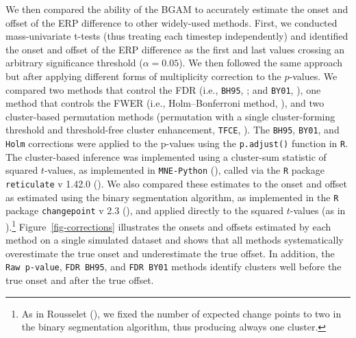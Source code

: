 \documentclass[
  doc,
  floatsintext,
  longtable,
  a4paper,
  nolmodern,
  notxfonts,
  notimes,
  colorlinks=true,linkcolor=blue,citecolor=blue,urlcolor=blue]{apa7}
\begin{document}
We then compared the ability of the BGAM to accurately estimate the
onset and offset of the ERP difference to other widely-used methods.
First, we conducted mass-univariate t-tests (thus treating each timestep
independently) and identified the onset and offset of the ERP difference
as the first and last values crossing an arbitrary significance
threshold (\(\alpha = 0.05\)). We then followed the same approach but
after applying different forms of multiplicity correction to the
\(p\)-values. We compared two methods that control the FDR (i.e.,
\texttt{BH95}, ; and \texttt{BY01}, ), one method that controls the FWER (i.e.,
Holm--Bonferroni method, ), and two
cluster-based permutation methods (permutation with a single
cluster-forming threshold and threshold-free cluster enhancement,
\texttt{TFCE}, ). The
\texttt{BH95}, \texttt{BY01}, and \texttt{Holm} corrections were applied
to the p-values using the \texttt{p.adjust()} function in \texttt{R}.
The cluster-based inference was implemented using a cluster-sum
statistic of squared \(t\)-values, as implemented in \texttt{MNE-Python}
(), called via the \texttt{R}
package \texttt{reticulate} v 1.42.0 (). We also compared these estimates to the onset and offset as
estimated using the binary segmentation algorithm, as implemented in the
\texttt{R} package \texttt{changepoint} v 2.3
(), and applied directly
to the squared \(t\)-values (as in
).\footnote{As in
  Rousselet (), we fixed the
  number of expected change points to two in the binary segmentation
  algorithm, thus producing always one cluster.}
Figure~\ref{fig-corrections} illustrates the onsets and offsets
estimated by each method on a single simulated dataset and shows that
all methods systematically overestimate the true onset and underestimate
the true offset. In addition, the \texttt{Raw\ p-value},
\texttt{FDR\ BH95}, and \texttt{FDR\ BY01} methods identify clusters
well before the true onset and after the true offset.
\end{document}
